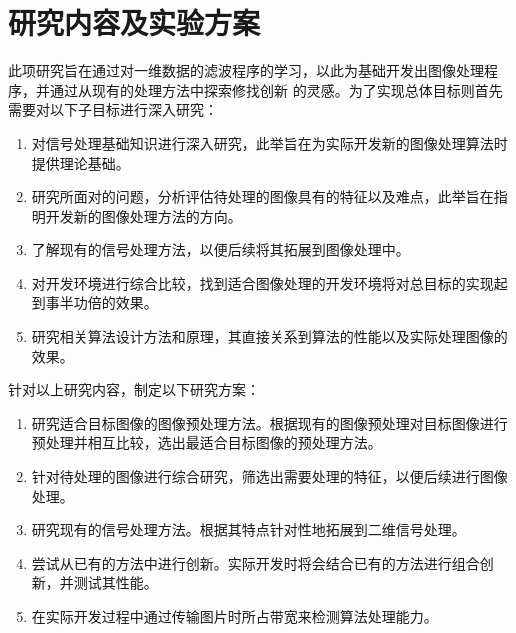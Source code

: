 %
%
%
%

\section{研究内容及实验方案}

此项研究旨在通过对一维数据的滤波程序的学习，以此为基础开发出图像处理程序，并通过从现有的处理方法中探索修找创新
的灵感。为了实现总体目标则首先需要对以下子目标进行深入研究：
\begin{enumerate}[label=\arabic*)]
    \item 对信号处理基础知识进行深入研究，此举旨在为实际开发新的图像处理算法时提供理论基础。
    \item 研究所面对的问题，分析评估待处理的图像具有的特征以及难点，此举旨在指明开发新的图像处理方法的方向。
    \item 了解现有的信号处理方法，以便后续将其拓展到图像处理中。
    \item 对开发环境进行综合比较，找到适合图像处理的开发环境将对总目标的实现起到事半功倍的效果。
    \item 研究相关算法设计方法和原理，其直接关系到算法的性能以及实际处理图像的效果。
\end{enumerate}



针对以上研究内容，制定以下研究方案：
\begin{enumerate}[label=\arabic*)]
    \item 研究适合目标图像的图像预处理方法。根据现有的图像预处理对目标图像进行预处理并相互比较，选出最适合目标图像的预处理方法。
    \item 针对待处理的图像进行综合研究，筛选出需要处理的特征，以便后续进行图像处理。
    \item 研究现有的信号处理方法。根据其特点针对性地拓展到二维信号处理。
    \item 尝试从已有的方法中进行创新。实际开发时将会结合已有的方法进行组合创新，并测试其性能。
    \item 在实际开发过程中通过传输图片时所占带宽来检测算法处理能力。
\end{enumerate}

